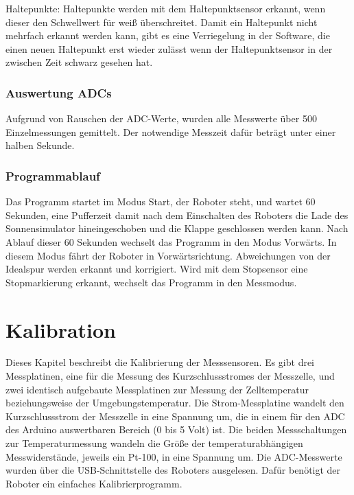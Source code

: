 \documentclass[a4paper,bibtotoc,oneside]{scrbook}
\begin{document}
Haltepunkte: Haltepunkte werden mit dem Haltepunktsensor erkannt, wenn dieser den Schwellwert für weiß überschreitet. Damit ein Haltepunkt nicht mehrfach erkannt werden kann, gibt es eine Verriegelung in der Software, die einen neuen Haltepunkt erst wieder zulässt wenn der Haltepunktsensor in der zwischen Zeit schwarz gesehen hat.



\subsection{Auswertung ADCs}\thispagestyle{empty}
Aufgrund von Rauschen der ADC-Werte, wurden alle Messwerte über 500 Einzelmessungen gemittelt. Der notwendige Messzeit dafür beträgt unter einer halben Sekunde. 

\subsection{Programmablauf}\thispagestyle{empty}
Das Programm startet im Modus Start, der Roboter steht, und wartet 60 Sekunden, eine Pufferzeit damit nach dem Einschalten des Roboters die Lade des Sonnensimulator hineingeschoben und die Klappe geschlossen werden kann.
Nach Ablauf dieser 60 Sekunden wechselt das Programm in den Modus Vorwärts. In diesem Modus fährt der Roboter in Vorwärtsrichtung. Abweichungen von der Idealspur werden erkannt und korrigiert. Wird mit dem Stopsensor eine Stopmarkierung erkannt, wechselt das Programm in den Messmodus. 



\chapter{Kalibration}\thispagestyle{empty}

Dieses Kapitel beschreibt die Kalibrierung der Messsensoren. Es gibt drei Messplatinen, eine für die Messung des Kurzschlussstromes der Messzelle, und zwei identisch aufgebaute Messplatinen zur Messung der Zelltemperatur beziehungsweise der Umgebungstemperatur. Die Strom-Messplatine wandelt den Kurzschlussstrom der Messzelle in eine Spannung um, die in einem für den ADC des Arduino auswertbaren Bereich (0 bis 5 Volt) ist. Die beiden Messschaltungen zur Temperaturmessung wandeln die Größe der temperaturabhängigen Messwiderstände, jeweils ein Pt-100, in eine Spannung um.
Die ADC-Messwerte wurden über die USB-Schnittstelle des Roboters ausgelesen. Dafür benötigt der Roboter ein einfaches Kalibrierprogramm.
\end{document}
